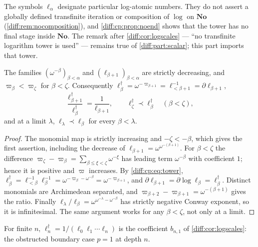 \documentclass[11pt,letterpaper]{article}
\numberwithin{equation}{section}
\theoremstyle{definition}
\theoremstyle{remark}
\newcommand{\No}{\mathbf{No}}
\newcommand{\der}{\partial}
\begin{document}
\begin{remark}
\label{diff:cp:rem:notation}
The symbols $\ell_{\alpha}$ designate particular log-atomic numbers. They do
not assert a globally defined transfinite iteration or composition of $\log$
on $\No$ (\cref{diff:rem:nocomposition}), and \cref{diff:cp:prop:noend} shows
that the tower has no final stage inside $\No$. The remark after
\cref{diff:cor:logscales} --- ``no transfinite logarithm tower is used'' ---
remains true of \cref{diff:part:scalar}; this part imports that tower.
\end{remark}

\begin{lemma}
\label{diff:cp:lem:scales}
The families $(\omega^{-\beta})_{\beta<\alpha}$ and
$(\ell_{\beta+1})_{\beta<\alpha}$ are strictly decreasing, and
$\varpi_{\beta}<\varpi_{\zeta}$ for $\beta<\zeta$. Consequently
$\ell_{\beta}^{\dagger}=\omega^{-\varpi_{\beta+1}}=\ell_{<\beta+1}^{-1}=\der\ell_{\beta+1}$,
\begin{equation}\label{diff:cp:eq:ratio}
 \frac{\ell_{\beta+1}^{\dagger}}{\ell_{\beta}^{\dagger}}=\frac{1}{\ell_{\beta+1}},
 \qquad
 \ell_{\zeta}^{\dagger}\prec\ell_{\beta}^{\dagger}\quad(\beta<\zeta),
\end{equation}
and at a limit $\lambda$, $\ell_{\lambda}\prec\ell_{\beta}$ for every
$\beta<\lambda$.
\end{lemma}
\begin{proof}
The monomial map is strictly increasing and $-\zeta<-\beta$, which gives the
first assertion, including the decrease of
$\ell_{\beta+1}=\omega^{\omega^{-(\beta+1)}}$.
For $\beta<\zeta$ the difference
$\varpi_{\zeta}-\varpi_{\beta}=\sum_{\beta\leq\xi<\zeta}\omega^{-\xi}$
has leading term $\omega^{-\beta}$ with coefficient $1$; hence it
is positive and $\varpi$ increases. By
\cref{diff:cp:eq:tower}, $\ell_{\beta}^{\dagger}=\ell_{<\beta}^{-1}\ell_{\beta}^{-1}
=\omega^{-\varpi_{\beta}-\omega^{-\beta}}=\omega^{-\varpi_{\beta+1}}$, and
$\der\ell_{\beta+1}=\der\log\ell_{\beta}=\ell_{\beta}^{\dagger}$. Distinct
monomials are Archimedean separated, and
$\varpi_{\beta+2}-\varpi_{\beta+1}=\omega^{-(\beta+1)}$ gives the ratio.
Finally
$\ell_{\lambda}/\ell_{\beta}
=\omega^{\omega^{-\lambda}-\omega^{-\beta}}$ has strictly negative
Conway exponent, so it is infinitesimal. The same argument works
for any $\beta<\zeta$, not only at a limit.
\end{proof}

For finite $n$, $\ell_{n}^{\dagger}=1/(\ell_{0}\ell_{1}\cdots\ell_{n})$ is the
coefficient $b_{n,1}$ of \cref{diff:cor:logscales}: the obstructed boundary
case $p=1$ at depth $n$.
\end{document}
